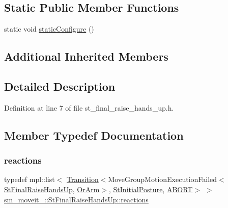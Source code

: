 \subsection*{Static Public Member Functions}
\begin{DoxyCompactItemize}
\item 
static void \hyperlink{structsm__moveit__4_1_1StFinalRaiseHandsUp_aabce6ade1a08aa3de0a2cfc1f33810bb}{static\+Configure} ()
\end{DoxyCompactItemize}
\subsection*{Additional Inherited Members}


\subsection{Detailed Description}


Definition at line 7 of file st\+\_\+final\+\_\+raise\+\_\+hands\+\_\+up.\+h.



\subsection{Member Typedef Documentation}
\mbox{\label{structsm__moveit__4_1_1StFinalRaiseHandsUp_af12b19b5e2f0f5fc3bbe6e8cee4d9bb1}} 
\subsubsection{\texorpdfstring{reactions}{reactions}}
{\footnotesize\ttfamily typedef mpl\+::list$<$ \hyperlink{classsmacc_1_1Transition}{Transition}$<$Move\+Group\+Motion\+Execution\+Failed$<$\hyperlink{structsm__moveit__4_1_1StFinalRaiseHandsUp}{St\+Final\+Raise\+Hands\+Up}, \hyperlink{classsm__moveit__4_1_1OrArm}{Or\+Arm}$>$, \hyperlink{structsm__moveit__4_1_1StInitialPosture}{St\+Initial\+Posture}, \hyperlink{structsmacc_1_1default__transition__tags_1_1ABORT}{A\+B\+O\+RT}$>$ $>$ \hyperlink{structsm__moveit__4_1_1StFinalRaiseHandsUp_af12b19b5e2f0f5fc3bbe6e8cee4d9bb1}{sm\+\_\+moveit\+\_\+::\+St\+Final\+Raise\+Hands\+Up\+::reactions}}



